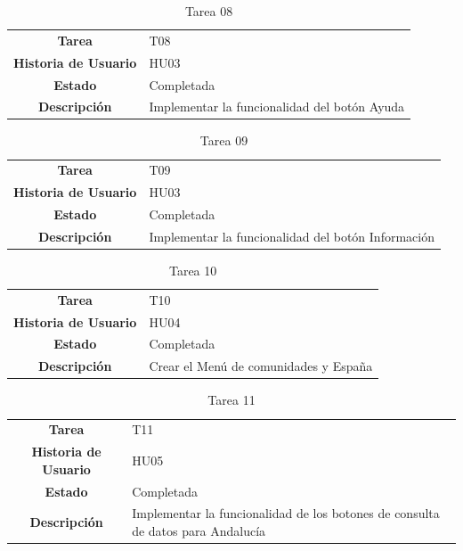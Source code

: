 \begin{table}[H]
	\begin{center}
		\begin{tabular}{| c | p{9cm} |}
			\hline
			
			\textbf{Tarea} & T08 \\
			\textbf{Historia de Usuario} & HU03 \\
			\textbf{Estado} & Completada \\
			\textbf{Descripción} & Implementar la funcionalidad del botón Ayuda \\ \hline
		\end{tabular}
		\caption{Tarea 08}
	\end{center}
\end{table}

\begin{table}[H]
	\begin{center}
		\begin{tabular}{| c | p{9cm} |}
			\hline
			
			\textbf{Tarea} & T09 \\
			\textbf{Historia de Usuario} & HU03 \\
			\textbf{Estado} & Completada \\
			\textbf{Descripción} & Implementar la funcionalidad del botón Información \\ \hline
		\end{tabular}
		\caption{Tarea 09}
	\end{center}
\end{table}

\begin{table}[H]
	\begin{center}
		\begin{tabular}{| c | p{9cm} |}
			\hline
			
			\textbf{Tarea} & T10 \\
			\textbf{Historia de Usuario} & HU04 \\
			\textbf{Estado} & Completada \\
			\textbf{Descripción} & Crear el Menú de comunidades y España \\ \hline
		\end{tabular}
		\caption{Tarea 10}
	\end{center}
\end{table}

\begin{table}[H]
	\begin{center}
		\begin{tabular}{| c | p{9cm} |}
			\hline
			
			\textbf{Tarea} & T11 \\
			\textbf{Historia de Usuario} & HU05 \\
			\textbf{Estado} & Completada \\
			\textbf{Descripción} & Implementar la funcionalidad de los botones de consulta de datos para Andalucía \\ \hline
		\end{tabular}
		\caption{Tarea 11}
	\end{center}
\end{table}

